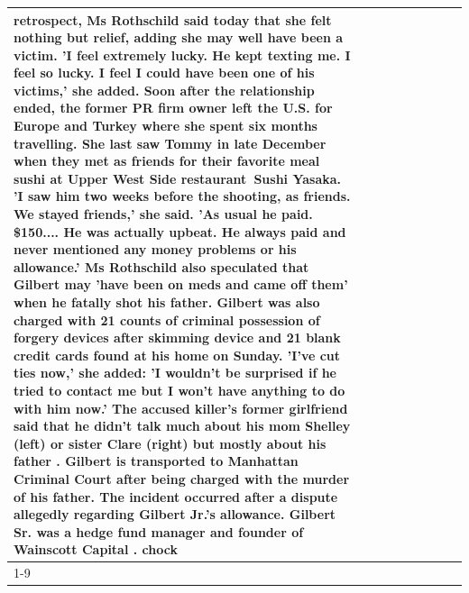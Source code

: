 \begin{table}[H]
\begin{tabular}{lllrlllll}
retrospect, Ms Rothschild said today that she felt nothing but relief, adding she may well have been a victim. 'I feel extremely lucky. He kept texting me. I feel so lucky. I feel I could have been one of his victims,' she added. Soon after the relationship ended, the former PR firm owner left the U.S. for Europe and Turkey where she spent six months  travelling. She last saw Tommy in late December when they met as friends for their favorite meal sushi at Upper West Side restaurant Sushi Yasaka. 'I saw him two weeks before the shooting, as friends. We stayed friends,' she said. 'As usual he paid. \$150.... He was actually upbeat. He always paid and never mentioned any money problems or his allowance.' Ms Rothschild also speculated that Gilbert may 'have been on meds and came off them' when he fatally shot his father. Gilbert was also charged with 21 counts of criminal possession of forgery devices after skimming device and 21 blank credit cards found at his home on Sunday. 'I've cut ties now,' she added: 'I wouldn’t be surprised if he tried to contact me but I won’t have anything to do with him now.' The accused killer's former girlfriend said that he didn't talk much about his mom Shelley (left) or sister Clare (right) but mostly about his father . Gilbert is transported to Manhattan Criminal Court  after being charged with the murder of his father. The incident occurred after a dispute allegedly regarding Gilbert Jr.'s allowance. Gilbert Sr. was a hedge fund manager and founder of Wainscott Capital . chock \\
\cline{1-9}
\bottomrule
\end{tabular}
\end{table}
